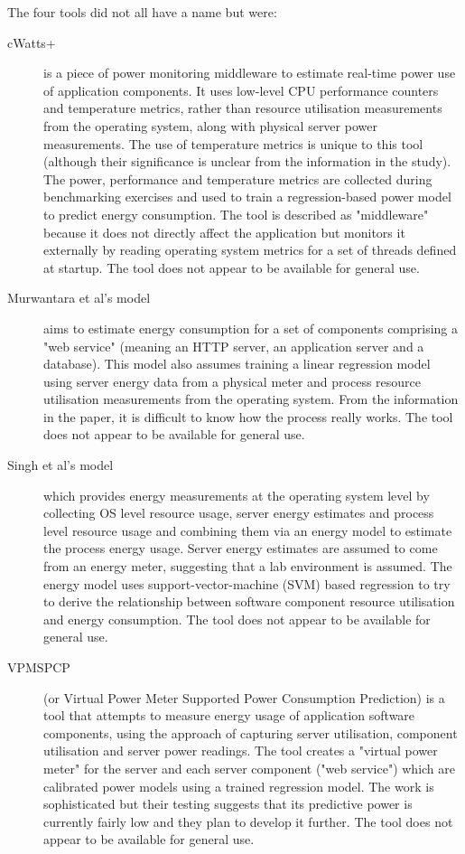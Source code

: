 The four tools did not all have a name but were:
\begin{description}
	\item[cWatts+] is a piece of power monitoring middleware to estimate real-time power use of application components.  It uses low-level CPU performance counters and temperature metrics, rather than resource utilisation measurements from the operating system, along with physical server power measurements.  The use of temperature metrics is unique to this tool (although their significance is unclear from the information in the study).  The power, performance and temperature metrics are collected during benchmarking exercises and used to train a regression-based power model to predict energy consumption.  The tool is described as "middleware" because it does not directly affect the application but monitors it externally by reading operating system metrics for a set of threads defined at startup. The tool does not appear to be available for general use. \cite{phung2017-agnosticpower}
	\item[Murwantara et al's model] aims to estimate energy consumption for a set of components comprising a "web service" (meaning an HTTP server, an application server and a database).  This model also assumes training a linear regression model using server energy data from a physical meter and process resource utilisation measurements from the operating system.  From the information in the paper, it is difficult to know how the process really works. The tool does not appear to be available for general use. \cite{murwantara2014-webserviceenergy}
	\item [Singh et al's model] which provides energy measurements at the operating system level by collecting OS level resource usage, server energy estimates and process level resource usage and combining them via an energy model to estimate the process energy usage.  Server energy estimates are assumed to come from an energy meter, suggesting that a lab environment is assumed. The energy model uses support-vector-machine (SVM) based regression to try to derive the relationship between software component resource utilisation and energy consumption.  The tool does not appear to be available for general use. \cite{singh2013-processenergyest}
	\item[VPMSPCP] (or Virtual Power Meter Supported Power Consumption Prediction) is a tool that attempts to measure energy usage of application software components, using the approach of capturing server utilisation, component utilisation and server power readings.  The tool creates a "virtual power meter" for the server and each server component ("web service") which are calibrated power models using a trained regression model.  The work is sophisticated but their testing suggests that its predictive power is currently fairly low and they plan to develop it further. The tool does not appear to be available for general use. \cite{liu2015-webservicepower}
\end{description}

